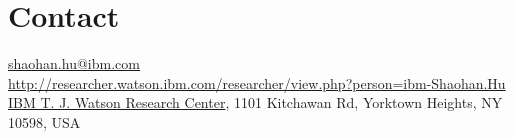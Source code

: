 
\section{\sc Contact}
{\href{mailto:shaohan.hu@ibm.com}{shaohan.hu@ibm.com}}\\
{\url{http://researcher.watson.ibm.com/researcher/view.php?person=ibm-Shaohan.Hu}}\\
{\href{http://www.research.ibm.com/labs/watson/}{IBM T. J. Watson Research Center}}, {1101 Kitchawan Rd, Yorktown Heights, NY 10598, USA}
